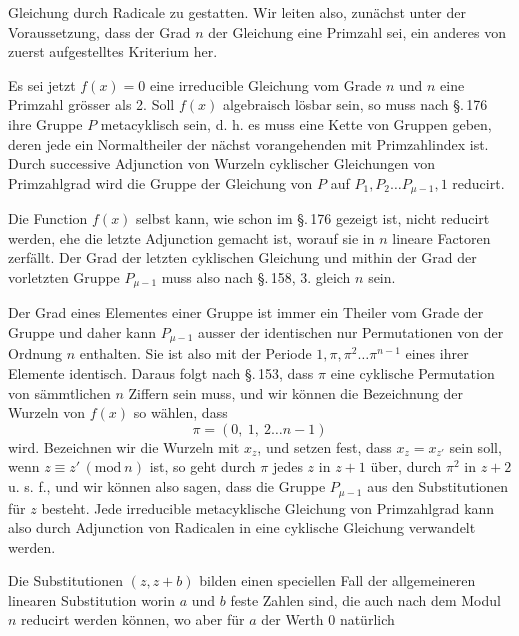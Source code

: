Gleichung durch Radicale zu gestatten. Wir leiten also, zunächst unter der
Voraussetzung, dass der Grad $n$ der Gleichung eine Primzahl sei, ein anderes von
 zuerst aufgestelltes Kriterium her.

Es sei jetzt $f(x) = 0$ eine irreducible Gleichung vom Grade $n$ und $n$ eine Primzahl
grösser als 2. Soll $f(x)$ algebraisch lösbar sein, so muss nach \S.\,176 ihre Gruppe
$P$ metacyklisch sein, d. h. es muss eine Kette von Gruppen
geben, deren jede ein Normaltheiler der nächst vorangehenden mit Primzahlindex ist.
Durch successive Adjunction von Wurzeln cyklischer Gleichungen von Primzahlgrad wird
die Gruppe der Gleichung von $P$ auf $P_1, P_2 \ldots P_{\mu-1}, 1$ reducirt.

Die Function $f(x)$ selbst kann, wie schon im \S.\,176 gezeigt ist, nicht reducirt
werden, ehe die letzte Adjunction gemacht ist, worauf sie in $n$ lineare Factoren
zerfällt. Der Grad der letzten cyklischen Gleichung und mithin der Grad der vorletzten
Gruppe $P_{\mu-1}$ muss also nach \S.\,158, 3. gleich $n$ sein.

Der Grad eines Elementes einer Gruppe ist immer ein Theiler vom Grade der Gruppe und
daher kann $P_{\mu-1}$ ausser der identischen nur Permutationen von der Ordnung $n$
enthalten. Sie ist also mit der Periode $1, \pi, \pi^2 \ldots \pi^{n-1}$ eines ihrer
Elemente identisch. Daraus folgt nach \S.\,153, dass $\pi$ eine cyklische Permutation
von sämmtlichen $n$ Ziffern sein muss, und wir können die Bezeichnung der Wurzeln von
$f(x)$ so wählen, dass
\[ \pi = (0,\ 1,\ 2 \ldots n-1) \]
wird. Bezeichnen wir die Wurzeln mit $x_z$, und setzen fest, dass $x_z = x_{z'}$ sein
soll, wenn $z \equiv z' \, (\mathrm{mod}\ n)$ ist, so geht durch $\pi$ jedes $z$ in
$z+1$ über, durch $\pi^2$ in $z+2$ u. s. f., und wir können also sagen, dass die
Gruppe $P_{\mu-1}$ aus den Substitutionen für $z$
besteht. Jede irreducible metacyklische Gleichung von Primzahlgrad kann also durch
Adjunction von Radicalen in eine cyklische Gleichung verwandelt werden.

Die Substitutionen $(z, z+b)$ bilden einen speciellen Fall der allgemeineren linearen
Substitution
worin $a$ und $b$ feste Zahlen sind, die auch nach dem Modul $n$ reducirt werden
können, wo aber für $a$ der Werth 0 natürlich
